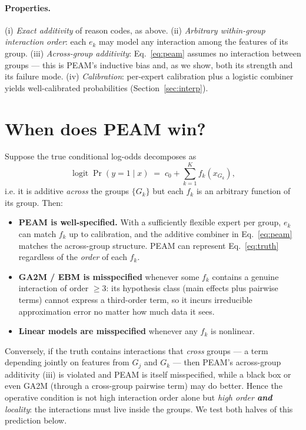 \documentclass{article}
\newcommand{\logit}{\operatorname{logit}}
\begin{document}
\paragraph{Properties.} (i) \emph{Exact additivity} of reason codes, as above.
(ii) \emph{Arbitrary within-group interaction order}: each $e_k$ may model any
interaction among the features of its group. (iii) \emph{Across-group additivity}:
Eq.~\eqref{eq:peam} assumes no interaction between groups --- this is PEAM's
inductive bias and, as we show, both its strength and its failure mode.
(iv) \emph{Calibration}: per-expert calibration plus a logistic combiner yields
well-calibrated probabilities (Section~\ref{sec:interp}).

\section{When does PEAM win?}
\label{sec:when}

Suppose the true conditional log-odds decomposes as
\begin{equation}
\logit \Pr(y{=}1\mid x) \;=\; c_0 + \sum_{k=1}^K f_k(x_{G_k}),
\label{eq:truth}
\end{equation}
i.e. it is additive \emph{across} the groups $\{G_k\}$ but each $f_k$ is an
arbitrary function of its group. Then:
\begin{itemize}
\item \textbf{PEAM is well-specified.} With a sufficiently flexible expert per
group, $e_k$ can match $f_k$ up to calibration, and the additive combiner in
Eq.~\eqref{eq:peam} matches the across-group structure. PEAM can represent
Eq.~\eqref{eq:truth} regardless of the \emph{order} of each $f_k$.
\item \textbf{GA2M / EBM is misspecified} whenever some $f_k$ contains a genuine
interaction of order $\geq 3$: its hypothesis class (main effects plus pairwise
terms) cannot express a third-order term, so it incurs irreducible approximation
error no matter how much data it sees.
\item \textbf{Linear models are misspecified} whenever any $f_k$ is nonlinear.
\end{itemize}
Conversely, if the truth contains interactions that \emph{cross} groups --- a term
depending jointly on features from $G_j$ and $G_k$ --- then PEAM's across-group
additivity (iii) is violated and PEAM is itself misspecified, while a black box
or even GA2M (through a cross-group pairwise term) may do better. Hence the
operative condition is not high interaction order alone but
\emph{high order \textbf{and} locality}: the interactions must live inside the
groups. We test both halves of this prediction below.
\end{document}
